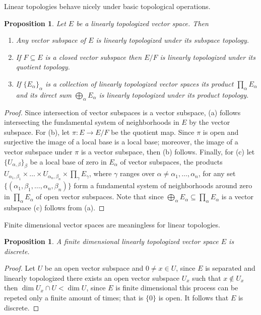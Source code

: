 \documentclass{book}[12pt]
\theoremstyle{definition}
\theoremstyle{plain}
\newtheorem{proposition}[definition]{Proposition}
\theoremstyle{remark}
\begin{document}
	Linear topologies behave nicely under basic topological operations.
	\begin{proposition}\label{linear_topologies_properties}
	Let $E$ be a linearly topologized vector space. Then
		\begin{enumerate}[label = (\alph*)]
			\item Any vector subspace of $E$ is linearly topologized under its subspace topology.
			\item If $F \subseteq E$ is a closed vector subspace then $E/F$ is linearly topologized under its quotient topology.
			\item If $\{E_{\alpha}\}_{\alpha}$ is a collection of linearly topologized vector spaces its product $\prod_{\alpha} E_{\alpha}$ and its direct sum $\bigoplus_{\alpha} E_{\alpha}$ is linearly topologized under its product topology.
		\end{enumerate}
	\end{proposition}
	\begin{proof}
		Since intersection of vector subspaces is a vector subspace, (a) follows intersecting the fundamental system of neighborhoods in $E$ by the vector subspace. For (b), let $\pi\colon E \to E/F$ be the quotient map. Since $\pi$ is open and surjective the image of a local base is a local base; moreover, the image of a vector subspace under $\pi$ is a vector subspace, then (b) follows. Finally, for (c) let $\{U_{\alpha, \beta}\}_{\beta}$ be a local base of zero in $E_{\alpha}$ of vector subspaces, the products $U_{\alpha_{1}, \beta_{1}} \times \ldots \times U_{\alpha_{n}, \beta_{n}} \times \prod_{\gamma} E_{\gamma}$, where $\gamma$ ranges over $\alpha \neq \alpha_{1}, \ldots, \alpha_{n}$, for any set $\{(\alpha_{1}, \beta_{1}, \ldots, \alpha_{n}, \beta_{n})\}$ form a fundamental system of neighborhoods around zero in $\prod_{\alpha} E_{\alpha}$ of open vector subspaces. Note that since $\bigoplus_{\alpha} E_{\alpha} \subseteq \prod_{\alpha} E_{\alpha}$ is a vector subspace (c) follows from (a). 
	\end{proof}
	Finite dimensional vector spaces are meaningless for linear topologies. 
	\begin{proposition}\label{finite_dimensional_linear_topologies}
		A finite dimensional linearly topologized vector space $E$ is discrete.
	\end{proposition}
	\begin{proof}
		Let $U$ be an open vector subspace and $0 \neq x \in U$, since $E$ is separated and linearly topologized there exists an open vector subspace $U_{x}$ such that $x \not\in U_{x}$ then $\dim U_{x} \cap U < \dim U$, since $E$ is finite dimensional this process can be repeted only a finite amount of times; that is $\{0\}$ is open. It follows that $E$ is discrete.
	\end{proof}
\end{document}
